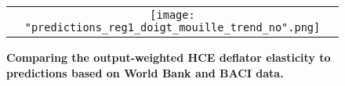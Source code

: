 \documentclass[11pt,a4paper]{paper} %
\begin{document}
\begin{figure}[H]
	\centering
	\caption{\footnotesize{\textbf{Comparing the output-weighted HCE deflator elasticity to predictions based on World Bank and BACI data.}}}
	\begin{tabular}{c}
		\texttt{[image: "predictions\_reg1\_doigt\_mouille\_trend\_no".png]}\\
	\end{tabular}
	\label{fig:panel_pred3}
\end{figure}





%
%
%
%
%
\end{document}
